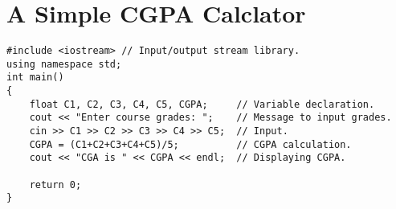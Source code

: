 \documentclass[12pt,a4paper]{article}
\begin{document}
\section{A Simple CGPA Calclator}
\begin{lstlisting}[caption={CGPA Calculator}]
#include <iostream> // Input/output stream library.
using namespace std;
int main()
{
	float C1, C2, C3, C4, C5, CGPA;		// Variable declaration.
	cout << "Enter course grades: ";	// Message to input grades.
	cin >> C1 >> C2 >> C3 >> C4 >> C5;	// Input.
	CGPA = (C1+C2+C3+C4+C5)/5;			// CGPA calculation.
	cout << "CGA is " << CGPA << endl;	// Displaying CGPA.
	
	return 0;
}
\end{lstlisting}
\nocite{*}


\end{document}
